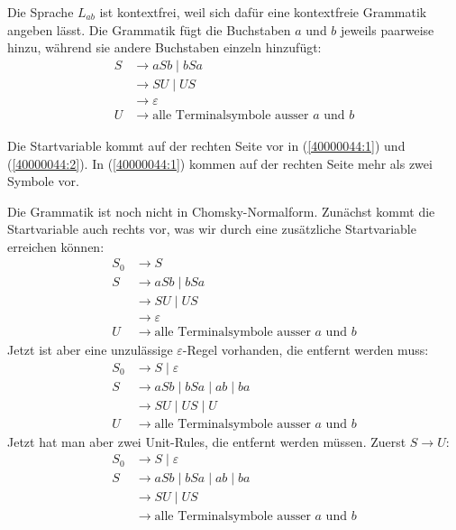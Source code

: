 \begin{loesung}
\begin{teilaufgaben}
\item
Die Sprache $L_{ab}$ ist kontextfrei, weil sich dafür eine kontextfreie
Grammatik angeben lässt.
Die Grammatik fügt die Buchstaben $a$ und $b$ jeweils paarweise
hinzu, während sie andere Buchstaben einzeln hinzufügt:
\begin{align}
S&\rightarrow aSb\mid  bSa \label{40000044:1}\\
 &\rightarrow SU \mid  US  \label{40000044:2}\\
 &\rightarrow \varepsilon  \label{40000044:3}\\
U&\rightarrow \text{alle Terminalsymbole ausser $a$ und $b$} \label{40000044:4}
\end{align}
\item
Die Startvariable kommt auf der rechten Seite vor in (\ref{40000044:1})
und (\ref{40000044:2}).
In (\ref{40000044:1}) kommen auf der rechten Seite mehr als zwei Symbole vor.
\item
Die Grammatik ist noch nicht in Chomsky-Normalform.
Zunächst kommt die Startvariable auch rechts vor, was wir durch eine
zusätzliche Startvariable erreichen können:
\begin{align*}
S_0&\rightarrow S\\
S  &\rightarrow aSb\mid  bSa\\
   &\rightarrow SU \mid  US\\
   &\rightarrow \varepsilon\\
U  &\rightarrow \text{alle Terminalsymbole ausser $a$ und $b$}
\end{align*}
Jetzt ist aber eine unzulässige $\varepsilon$-Regel vorhanden, die entfernt
werden muss:
\begin{align*}
S_0&\rightarrow S\mid \varepsilon\\
S  &\rightarrow aSb\mid  bSa\mid ab\mid ba\\
   &\rightarrow SU \mid  US\mid U\;\\
U  &\rightarrow \text{alle Terminalsymbole ausser $a$ und $b$}
\end{align*}
Jetzt hat man aber zwei Unit-Rules, die entfernt werden müssen.
Zuerst $S\rightarrow U$:
\begin{align*}
S_0&\rightarrow S\mid \varepsilon\\
S  &\rightarrow aSb\mid  bSa\mid ab\mid ba\\
   &\rightarrow SU \mid  US\\
   &\rightarrow \text{alle Terminalsymbole ausser $a$ und $b$}\\

\end{align*}
\end{teilaufgaben}
\end{loesung}

